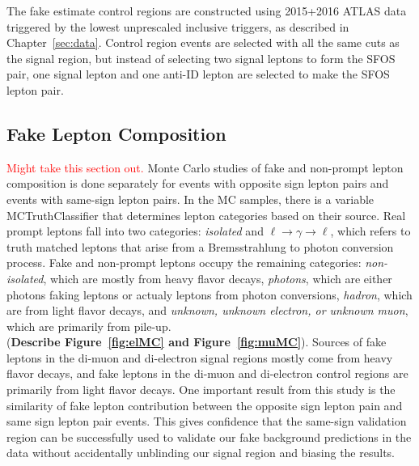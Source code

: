 The fake estimate control regions are constructed using 2015+2016 ATLAS data triggered by the lowest unprescaled inclusive \met{} triggers, as described in Chapter~\ref{sec:data}.  Control region events are selected with all the same cuts as the signal region, but instead of selecting two signal leptons to form the SFOS pair, one signal lepton and one anti-ID lepton are selected to make the SFOS lepton pair. 
  \FloatBarrier
  \iffalse
  \subsection{Fake Lepton Composition}
  \textcolor{red}{Might take this section out.}
 Monte Carlo studies of fake and non-prompt lepton composition is done separately for events with opposite sign lepton pairs and events with same-sign lepton pairs.  In the MC samples, there is a variable MCTruthClassifier that determines lepton categories based on their source.  Real prompt leptons fall into two categories: \textit{isolated} and $\ell\rightarrow \gamma \rightarrow \ell$, which refers to truth matched leptons that arise from a Bremsstrahlung to photon conversion process. Fake and non-prompt leptons occupy the remaining categories: \textit{non-isolated}, which are mostly from heavy flavor decays, \textit{photons}, which are either photons faking leptons or actualy leptons from photon conversions, \textit{hadron}, which are from light flavor decays, and \textit{unknown, unknown electron, or unknown muon}, which are primarily from pile-up.\\
 
(\textbf{Describe Figure~\ref{fig:elMC} and Figure~\ref{fig:muMC}}). Sources of fake leptons in the di-muon and di-electron signal regions mostly come from heavy flavor decays, and fake leptons in the di-muon and di-electron control regions are primarily from light flavor decays.  One important result from this study is the similarity of fake lepton contribution between the opposite sign lepton pain and same sign lepton pair events.  This gives confidence that the same-sign validation region can be successfully used to validate our fake background predictions in the data without accidentally unblinding our signal region and biasing the results.  

